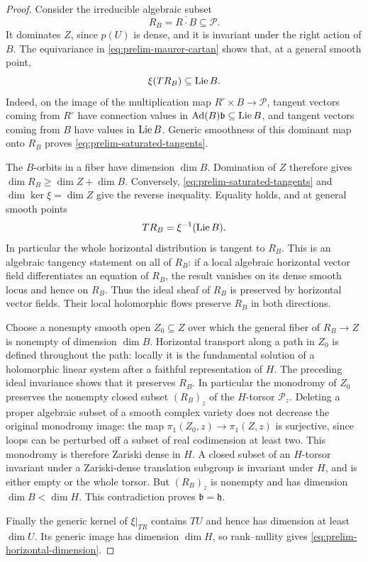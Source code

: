 \begin{proof}
Consider the irreducible algebraic subset
\[
 R_B=\overline{R\cdot B}\subseteq\mathcal P.
\]
It dominates $Z$, since $p(U)$ is dense, and it is invariant under the
right action of $B$.  The equivariance in
\eqref{eq:prelim-maurer-cartan} shows that, at a general smooth point,
\begin{equation}\label{eq:prelim-saturated-tangents}
 \xi(T R_B)\subseteq\operatorname{Lie} B.
\end{equation}
Indeed, on the image of the multiplication map $R^\circ\times B\to
\mathcal P$, tangent vectors coming from $R^\circ$ have connection
values in $\operatorname{Ad}(B)\mathfrak b\subseteq\operatorname{Lie} B$, and
tangent vectors coming from $B$ have values in $\operatorname{Lie} B$.  Generic
smoothness of this dominant map onto $R_B$ proves
\eqref{eq:prelim-saturated-tangents}.

The $B$-orbits in a fiber have dimension $\dim B$.  Domination of $Z$
therefore gives
$\dim R_B\geq\dim Z+\dim B$.  Conversely,
\eqref{eq:prelim-saturated-tangents} and
$\dim\ker\xi=\dim Z$ give the reverse inequality.  Equality holds,
and at general smooth points
\[
 TR_B=\xi^{-1}(\operatorname{Lie} B).
\]
In particular the whole horizontal distribution is tangent to $R_B$.
This is an algebraic tangency statement on all of $R_B$: if a local
algebraic horizontal vector field differentiates an equation of $R_B$,
the result vanishes on its dense smooth locus and hence on $R_B$.
Thus the ideal sheaf of $R_B$ is preserved by horizontal vector fields.
Their local holomorphic flows preserve $R_B$ in both directions.

Choose a nonempty smooth open $Z_0\subseteq Z$ over which the general
fiber of $R_B\to Z$ is nonempty of dimension $\dim B$.  Horizontal
transport along a path in $Z_0$ is defined throughout the path: locally
it is the fundamental solution of a holomorphic linear system after a
faithful representation of $H$.  The preceding ideal invariance shows
that it preserves $R_B$.  In particular the monodromy of $Z_0$ preserves
the nonempty closed subset $(R_B)_z$ of the $H$-torsor $\mathcal P_z$.
Deleting a proper algebraic subset of a smooth complex variety does not
decrease the original monodromy image: the map
$\pi_1(Z_0,z)\to\pi_1(Z,z)$ is surjective, since loops can be perturbed
off a subset of real codimension at least two.  This monodromy is
therefore Zariski dense in $H$.  A closed subset of an $H$-torsor
invariant under a Zariski-dense translation subgroup is invariant under
$H$, and is either empty or the whole torsor.  But $(R_B)_z$ is nonempty
and has dimension $\dim B<\dim H$.  This contradiction proves
$\mathfrak b=\mathfrak h$.

Finally the generic kernel of $\xi|_{TR}$ contains $TU$ and hence has
dimension at least $\dim U$.  Its generic image has dimension $\dim H$,
so rank--nullity gives \eqref{eq:prelim-horizontal-dimension}.
\end{proof}


